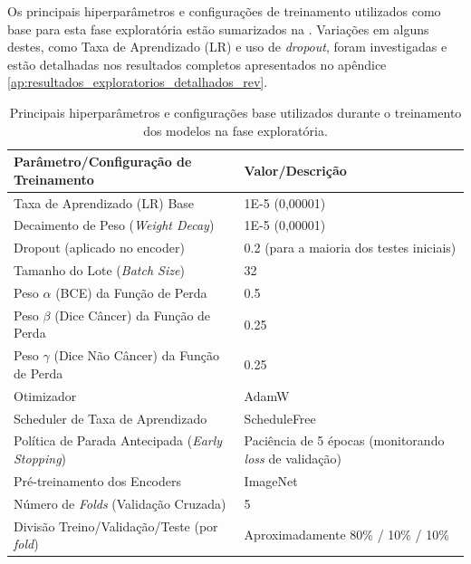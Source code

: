 Os principais hiperparâmetros e configurações de treinamento utilizados como base para esta fase exploratória estão sumarizados na . Variações em alguns destes, como Taxa de Aprendizado (LR) e uso de \textit{dropout}, foram investigadas e estão detalhadas nos resultados completos apresentados no apêndice \ref{ap:resultados_exploratorios_detalhados_rev}.

\begin{table}[!htb]
\centering
\caption[Sumário dos principais hiperparâmetros de treinamento da fase exploratória.]{Principais hiperparâmetros e configurações base utilizados durante o treinamento dos modelos na fase exploratória.}
\label{tab:sumario_hiperparametros_treino_exploratorio} 
\begin{tabular}{l p{}} %
\toprule
\textbf{Parâmetro/Configuração de Treinamento} & \textbf{Valor/Descrição} \\
\midrule
Taxa de Aprendizado (LR) Base & 1E-5 (0,00001) \\
Decaimento de Peso (\textit{Weight Decay}) & 1E-5 (0,00001) \\
Dropout (aplicado no encoder) & 0.2 (para a maioria dos testes iniciais) \\
Tamanho do Lote (\textit{Batch Size}) & 32 \\ %
Peso $\alpha$ (BCE) da Função de Perda & 0.5 \\
Peso $\beta$ (Dice Câncer) da Função de Perda & 0.25 \\
Peso $\gamma$ (Dice Não Câncer) da Função de Perda & 0.25 \\
Otimizador & AdamW \\
Scheduler de Taxa de Aprendizado & ScheduleFree \\
Política de Parada Antecipada (\textit{Early Stopping}) & Paciência de 5 épocas (monitorando \textit{loss} de validação) \\
Pré-treinamento dos Encoders & ImageNet \\
Número de \textit{Folds} (Validação Cruzada) & 5 \\
Divisão Treino/Validação/Teste (por \textit{fold}) & Aproximadamente 80\% / 10\% / 10\% \\
\bottomrule
\end{tabular}
\end{table}

